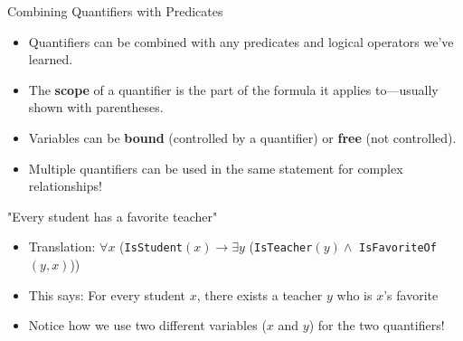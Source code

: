 \documentclass{beamer}
\begin{document}
	\begin{frame}{Combining Quantifiers with Predicates}
		\begin{itemize}
			\item Quantifiers can be combined with any predicates and logical operators we've learned.
			\item The \textbf{scope} of a quantifier is the part of the formula it applies to—usually shown with parentheses.
			\item Variables can be \textbf{bound} (controlled by a quantifier) or \textbf{free} (not controlled).
			\item Multiple quantifiers can be used in the same statement for complex relationships!
		\end{itemize}
		
		\begin{example}
			"Every student has a favorite teacher"
			\begin{itemize}
				\scriptsize
				\item Translation: $\forall x$ (\texttt{IsStudent}$(x) \rightarrow \exists y$ (\texttt{IsTeacher}$(y) \land$ \texttt{IsFavoriteOf}$(y, x)$))
				\item This says: For every student $x$, there exists a teacher $y$ who is $x$'s favorite
				\item Notice how we use two different variables ($x$ and $y$) for the two quantifiers!
			\end{itemize}
		\end{example}
	\end{frame}
	
\end{document}

